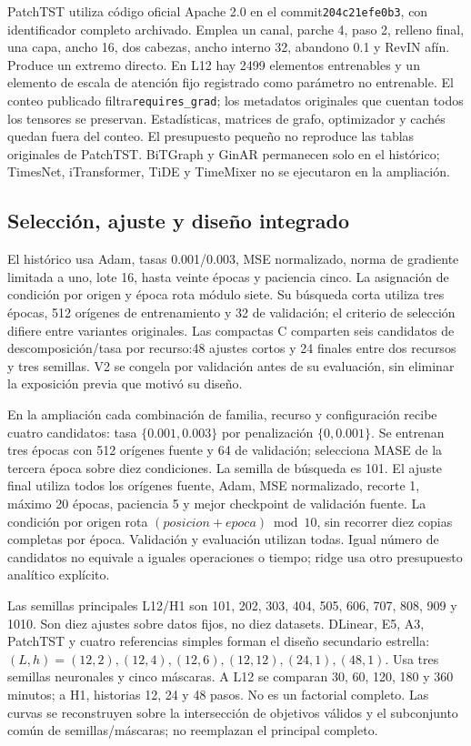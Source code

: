 PatchTST utiliza código oficial Apache 2.0 en el commit\texttt{204c21efe0b3}, con identificador completo archivado. Emplea un canal, parche 4, paso 2, relleno final, una capa, ancho 16, dos cabezas, ancho interno 32, abandono 0.1 y RevIN afín. Produce un extremo directo. En L12 hay 2499 elementos entrenables y un elemento de escala de atención fijo registrado como parámetro no entrenable. El conteo publicado filtra\texttt{requires\_grad}; los metadatos originales que cuentan todos los tensores se preservan. Estadísticas, matrices de grafo, optimizador y cachés quedan fuera del conteo. El presupuesto pequeño no reproduce las tablas originales de PatchTST. BiTGraph y GinAR permanecen solo en el histórico; TimesNet, iTransformer, TiDE y TimeMixer no se ejecutaron en la ampliación.

\subsection{Selección, ajuste y diseño integrado}
El histórico usa Adam, tasas 0.001/0.003, MSE normalizado, norma de gradiente limitada a uno, lote 16, hasta veinte épocas y paciencia cinco. La asignación de condición por origen y época rota módulo siete. Su búsqueda corta utiliza tres épocas, 512 orígenes de entrenamiento y 32 de validación; el criterio de selección difiere entre variantes originales. Las compactas C comparten seis candidatos de descomposición/tasa por recurso:48 ajustes cortos y 24 finales entre dos recursos y tres semillas. V2 se congela por validación antes de su evaluación, sin eliminar la exposición previa que motivó su diseño.

En la ampliación cada combinación de familia, recurso y configuración recibe cuatro candidatos: tasa $\{0.001, 0.003\}$ por penalización $\{0, 0.001\}$. Se entrenan tres épocas con 512 orígenes fuente y 64 de validación; selecciona MASE de la tercera época sobre diez condiciones. La semilla de búsqueda es 101. El ajuste final utiliza todos los orígenes fuente, Adam, MSE normalizado, recorte 1, máximo 20 épocas, paciencia 5 y mejor checkpoint de validación fuente. La condición por origen rota $(posicion+epoca)\bmod 10$, sin recorrer diez copias completas por época. Validación y evaluación utilizan todas. Igual número de candidatos no equivale a iguales operaciones o tiempo; ridge usa otro presupuesto analítico explícito.

Las semillas principales L12/H1 son 101, 202, 303, 404, 505, 606, 707, 808, 909 y 1010. Son diez ajustes sobre datos fijos, no diez datasets. DLinear, E5, A3, PatchTST y cuatro referencias simples forman el diseño secundario estrella:$ (L,h)=(12, 2),(12, 4),(12, 6),(12, 12),(24, 1),(48, 1)$. Usa tres semillas neuronales y cinco máscaras. A L12 se comparan 30, 60, 120, 180 y 360 minutos; a H1, historias 12, 24 y 48 pasos. No es un factorial completo. Las curvas se reconstruyen sobre la intersección de objetivos válidos y el subconjunto común de semillas/máscaras; no reemplazan el principal completo.


